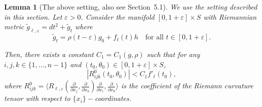 \documentclass[JEP,XML,SOM,Unicode,NoFloatCountersInSection]{cedram}
\newtheorem{lemma}[theorem]{Lemma}
\theoremstyle{definition}
\let\eps\varepsilon
\renewcommand{\>}{{\rangle}}
\newcommand{\<}{{\langle}}
\begin{document}
\begin{lemma}[The above setting, also see Section~5.1]\label{lem: bdd_curv_tensor_C12}
We use the setting described in this section. Let $\eps>0$. Consider the manifold $[0,1+\eps]\times S$ with Riemannian metric $\tilde g_{\ell,\eps}=dt^2+\tilde g_t$ where
\begin{equation*}
\tilde g_t = \rho(t-\eps)g_0+f_\ell(t)h \quad \text{for all } t\in [0,1+\eps].
\end{equation*}

Then, there exists a constant $C_1=C_1(g, \rho)$ such that for any $i,j,k\in\{1,\dots,n-1\}$ and $(t_0,\theta_0)\in[0,1+\eps]\times S$,
\begin{equation*}
|R^0_{ijk}(t_0,\theta_0)|<C_1f'_\ell(t_0),
\end{equation*}
where $R^0_{ijk} = \langle R_{\ell,\eps}(\frac{\partial}{\partial x_j},\frac{\partial}{\partial x_k})\frac{\partial}{\partial x_i},\frac{\partial}{\partial x_0}\rangle$ is the coefficient of the Riemann curvature tensor with respect to $\{x_i\}-$coordinates.
\end{lemma}
\end{document}
